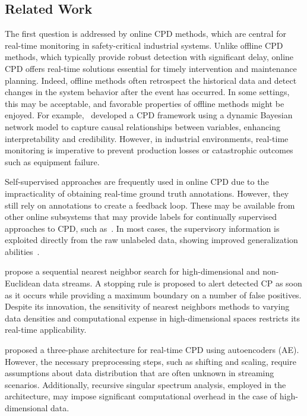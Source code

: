\subsection{Related Work}
The first question is addressed by online CPD methods, which are central for real-time monitoring in safety-critical industrial systems. Unlike offline CPD methods, which typically provide robust detection with significant delay, online CPD offers real-time solutions essential for timely intervention and maintenance planning. Indeed, offline methods often retrospect the historical data and detect changes in the system behavior after the event has occurred. In some settings, this may be acceptable, and favorable properties of offline methods might be enjoyed. For example,~\cite{Liu2022} developed a CPD framework using a dynamic Bayesian network model to capture causal relationships between variables, enhancing interpretability and credibility. However, in industrial environments, real-time monitoring is imperative to prevent production losses or catastrophic outcomes such as equipment failure.

Self-supervised approaches are frequently used in online CPD due to the impracticality of obtaining real-time ground truth annotations. However, they still rely on annotations to create a feedback loop. These may be available from other online subsystems that may provide labels for continually supervised approaches to CPD, such as~\cite{Korycki2021}. In most cases, the supervisory information is exploited directly from the raw unlabeled data, showing improved generalization abilities~\cite{Zhang2024}.  %

\cite{Chu2022} propose a sequential nearest neighbor search for high-dimensional and non-Euclidean data streams. A stopping rule is proposed to alert detected CP as soon as it occurs while providing a maximum boundary on a number of false positives. Despite its innovation, the sensitivity of nearest neighbors methods to varying data densities and computational expense in high-dimensional spaces restricts its real-time applicability.

\cite{Gupta2022} proposed a three-phase architecture for real-time CPD using autoencoders (AE). However, the necessary preprocessing steps, such as shifting and scaling, require assumptions about data distribution that are often unknown in streaming scenarios. Additionally, recursive singular spectrum analysis, employed in the architecture, may impose significant computational overhead in the case of high-dimensional data.

